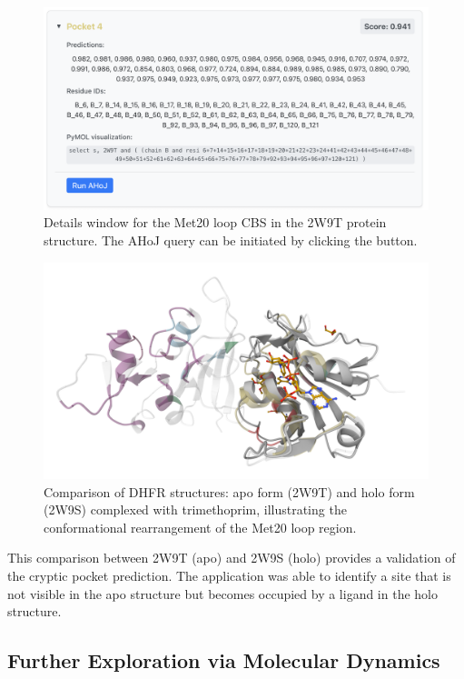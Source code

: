 \begin{figure}[htpb]
    \centering
    \includegraphics[width=\textwidth]{img/ahoj-btn.png}
    \caption{Details window for the Met20 loop CBS in the 2W9T protein structure. The AHoJ query can be initiated by clicking the button.}
    \label{fig:ahoj-btn}
\end{figure}

\begin{figure}[htpb]
    \centering
    \includegraphics[width=\textwidth]{img/2w9t_2w9s.png}
    \caption{Comparison of DHFR structures: apo form (2W9T) and holo form (2W9S) complexed with trimethoprim, illustrating the conformational rearrangement of the Met20 loop region.}
    \label{fig:2w9t_2w9s}
\end{figure}

This comparison between 2W9T (apo) and 2W9S (holo) provides a validation of the cryptic pocket prediction. The application was able to identify a site that is not visible in the apo structure but becomes occupied by a ligand in the holo structure.

\subsection{Further Exploration via Molecular Dynamics}
\label{subsec:md-exploration}

